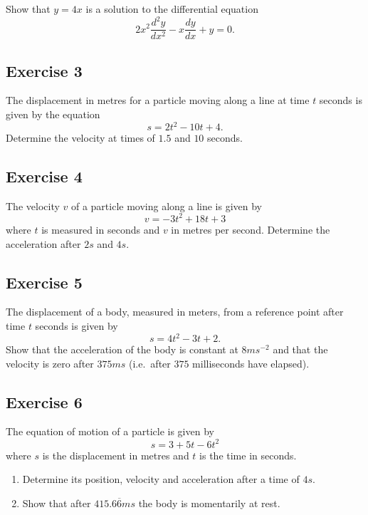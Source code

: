 \documentclass[
  11pt,
  oneside]{book}
\providecommand{\tightlist}{%
  \setlength{\itemsep}{0pt}\setlength{\parskip}{0pt}}
\newcommand{\slide}{}
\theoremstyle{definition}
\theoremstyle{definition}
\theoremstyle{definition}
\theoremstyle{definition}
\theoremstyle{remark}
\begin{document}
Show that \(y=4x\) is a solution to the differential equation
\[
2x^2\frac{d^2y}{dx^2}-x\frac{dy}{dx}+y=0.
\]

\slide

\subsection*{Exercise 3}\label{exercise-3-1}

The displacement in metres for a particle moving along a line at time \(t\) seconds is given by the equation
\[
s=2t^2-10t+4.
\]
Determine the velocity at times of \(1.5\) and \(10\) seconds.

\slide

\subsection*{Exercise 4}\label{exercise-4-1}

The velocity \(v\) of a particle moving along a line is given by
\[
v=-3t^2+18t+3
\]
where \(t\) is measured in seconds and \(v\) in metres per second. Determine the acceleration after \(2s\) and \(4s\).
\slide

\subsection*{Exercise 5}\label{exercise-5}

The displacement of a body, measured in meters, from a reference point after time \(t\) seconds is given by
\[
s=4t^2-3t+2.
\]
Show that the acceleration of the body is constant at \(8ms^{-2}\) and that the velocity is zero after \(375ms\) (i.e.~after \(375\) milliseconds have elapsed).
\slide

\subsection*{Exercise 6}\label{exercise-6}

The equation of motion of a particle is given by
\[
s=3+5t-6t^2
\]
where \(s\) is the displacement in metres and \(t\) is the time in seconds.

\begin{enumerate}
\def\labelenumi{\alph{enumi}.}
\tightlist
\item
  Determine its position, velocity and acceleration after a time of \(4s\).
\item
  Show that after \(415.6\overline{6}ms\) the body is momentarily at rest.
\end{enumerate}
\end{document}
